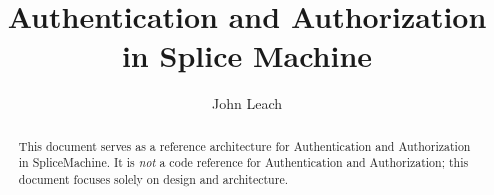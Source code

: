 \documentclass[10pt]{amsart}
\begin{document}
\title{Authentication and Authorization in Splice Machine }
\author{John Leach}

\begin{abstract}
This document serves as a reference architecture for Authentication and
Authorization in SpliceMachine.  It is \emph{not} a
code reference for Authentication and Authorization; this document focuses
solely on design and architecture.
\end{abstract}

\maketitle


\end{document}
